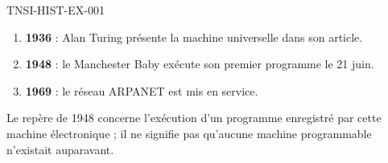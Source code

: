 \begin{corrige}{TNSI-HIST-EX-001}
\begin{enumerate}
  \item \textbf{1936} : Alan Turing présente la machine universelle dans son article.
  \item \textbf{1948} : le Manchester Baby exécute son premier programme le 21 juin.
  \item \textbf{1969} : le réseau ARPANET est mis en service.
\end{enumerate}
Le repère de 1948 concerne l'exécution d'un programme enregistré par cette
machine électronique ; il ne signifie pas qu'aucune machine programmable
n'existait auparavant.
\end{corrige}
